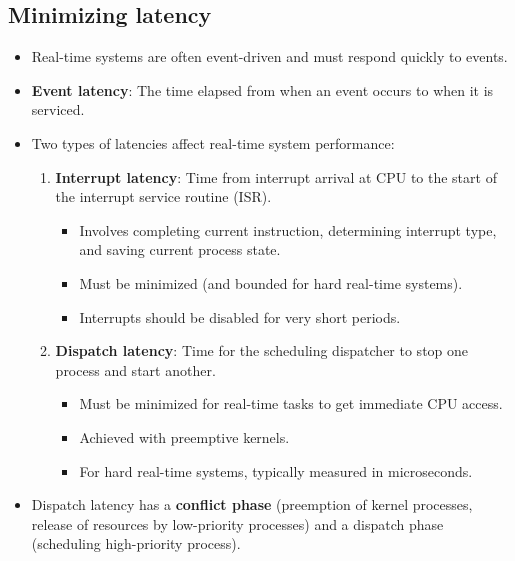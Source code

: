 \subsection{Minimizing latency}
\begin{itemize}
    \item Real-time systems are often event-driven and must respond quickly to events.
    \item \textbf{Event latency}: The time elapsed from when an event occurs to when it is serviced.
    \item Two types of latencies affect real-time system performance:
        \begin{enumerate}
            \item \textbf{Interrupt latency}: Time from interrupt arrival at CPU to the start of the interrupt service routine (ISR).
                \begin{itemize}
                    \item Involves completing current instruction, determining interrupt type, and saving current process state.
                    \item Must be minimized (and bounded for hard real-time systems).
                    \item Interrupts should be disabled for very short periods.
                \end{itemize}
            \item \textbf{Dispatch latency}: Time for the scheduling dispatcher to stop one process and start another.
                \begin{itemize}
                    \item Must be minimized for real-time tasks to get immediate CPU access.
                    \item Achieved with preemptive kernels.
                    \item For hard real-time systems, typically measured in microseconds.
                \end{itemize}
        \end{enumerate}
    \item Dispatch latency has a \textbf{conflict phase} (preemption of kernel processes, release of resources by low-priority processes) and a dispatch phase (scheduling high-priority process).
\end{itemize}

